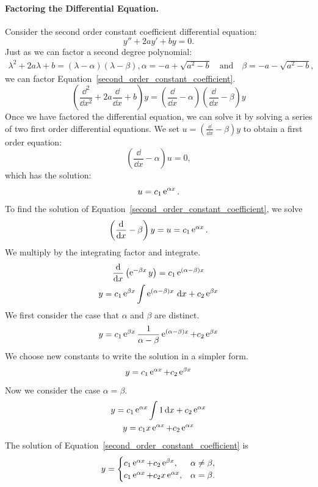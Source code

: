 \paragraph{Factoring the Differential Equation.}
Consider the second order constant coefficient differential equation:
\begin{equation}
  \label{second_order_constant_coefficient}
  y'' + 2 a y' + b y = 0.
\end{equation}
Just as we can factor a second degree polynomial:
\begin{gather}
  \label{quadratic_lambda}
  \lambda^2 + 2 a \lambda + b = (\lambda - \alpha)(\lambda - \beta),
  \nonumber
  \alpha = -a + \sqrt{a^2 - b} \quad \mathrm{and} \quad
  \beta = -a - \sqrt{a^2 - b},
\end{gather}
we can factor Equation~\ref{second_order_constant_coefficient}.
\[
\left( \frac{\dd^2}{\dd x^2} + 2 a \frac{\dd}{\dd x} + b \right) y  =
\left( \frac{\dd}{\dd x} - \alpha \right) \left( \frac{\dd}{\dd x} - \beta \right) y
\]
Once we have factored the differential equation, we can solve it by 
solving a series of two first order differential equations.
We set $u = \left( \frac{\dd}{\dd x} - \beta \right) y$ to obtain a first order
equation:
\[
\left( \frac{\dd}{\dd x} - \alpha \right) u = 0,
\]
which has the solution:
\[
u = c_1 \mathop{\mathrm{e}}\nolimits^{\alpha x}.
\]
To find the solution of Equation~\ref{second_order_constant_coefficient},
we solve
\[
\left( \frac{\mathrm{d}}{\mathrm{d} x} - \beta \right) y = u = c_1 \mathop{\mathrm{e}}\nolimits^{\alpha x}.
\]
We multiply by the integrating factor and integrate.
\begin{gather*}
  \frac{\mathrm{d}}{\mathrm{d} x} \left( \mathop{\mathrm{e}}\nolimits^{-\beta x} y \right) = c_1 \mathop{\mathrm{e}}\nolimits^{(\alpha - \beta) x} 
  \\
  y = c_1 \mathop{\mathrm{e}}\nolimits^{\beta x} \int \mathop{\mathrm{e}}\nolimits^{(\alpha - \beta) x} \,\mathrm{d} x + c_2 \mathop{\mathrm{e}}\nolimits^{\beta x}
\end{gather*}
We first consider the case that $\alpha$ and $\beta$ are distinct.
\[
y = c_1 \mathop{\mathrm{e}}\nolimits^{\beta x} \frac{1}{\alpha - \beta} \mathop{\mathrm{e}}\nolimits^{(\alpha - \beta) x} + c_2 \mathop{\mathrm{e}}\nolimits^{\beta x}
\]
We choose new constants to write the solution in a simpler form.
\[
y = c_1 \mathop{\mathrm{e}}\nolimits^{\alpha x} + c_2 \mathop{\mathrm{e}}\nolimits^{\beta x}
\]
Now we consider the case $\alpha = \beta$.
\begin{gather*}
  y = c_1 \mathop{\mathrm{e}}\nolimits^{\alpha x} \int 1 \,\mathrm{d} x + c_2 \mathop{\mathrm{e}}\nolimits^{\alpha x} 
  \\
  y = c_1 x \mathop{\mathrm{e}}\nolimits^{\alpha x} + c_2 \mathop{\mathrm{e}}\nolimits^{\alpha x}
\end{gather*}
The solution of Equation~\ref{second_order_constant_coefficient} is
\begin{equation}
  \label{equation solution 2nd order const coeff factor}
  y = \begin{cases}
    c_1 \mathop{\mathrm{e}}\nolimits^{\alpha x} + c_2 \mathop{\mathrm{e}}\nolimits^{\beta x}, &\alpha \neq \beta, \\
    c_1 \mathop{\mathrm{e}}\nolimits^{\alpha x} + c_2 x \mathop{\mathrm{e}}\nolimits^{\alpha x}, &\alpha = \beta.
  \end{cases}
\end{equation}






